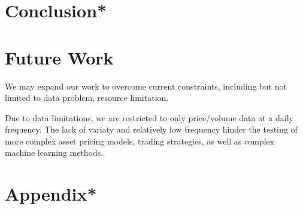\documentclass[12pt]{article}
\begin{document}
\section{Conclusion*}


\section{Future Work}

We may expand our work to overcome current constraints, including but not limited to data problem, resource limitation.

Due to data limitations, we are restricted to only price/volume data at a daily frequency. The lack of variaty and relatively low frequency hinder the testing of more complex asset pricing models, trading strategies, as well as complex machine learning methods.


\section{Appendix*}


\renewcommand{\refname}{Reference} %
\printbibliography
\end{document}
